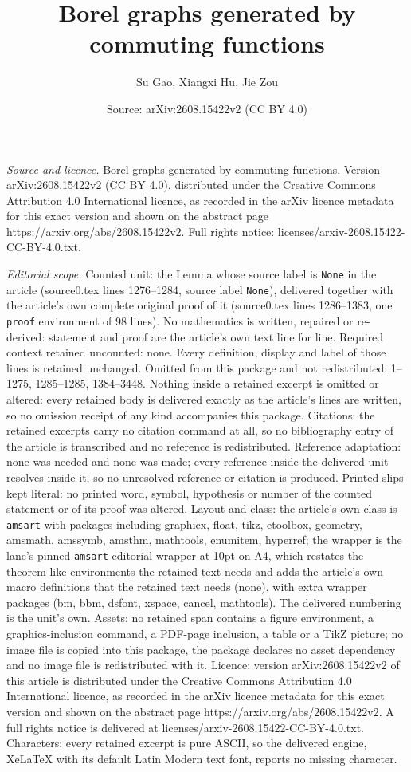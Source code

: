 \documentclass[10pt,a4paper]{amsart}
\title[Borel graphs generated by commuting functions]{Borel graphs generated by commuting functions}
\author{Su Gao, Xiangxi Hu, Jie Zou}
\date{Source: arXiv:2608.15422v2 (CC BY 4.0)}
\begin{document}
\maketitle

\noindent\emph{Source and licence.} Borel graphs generated by commuting functions. Version arXiv:2608.15422v2 (CC BY 4.0), distributed under the Creative Commons Attribution 4.0 International licence, as recorded in the arXiv licence metadata for this exact version and shown on the abstract page https://arxiv.org/abs/2608.15422v2. Full rights notice: licenses/arxiv-2608.15422-CC-BY-4.0.txt.\par\smallskip

\noindent\textit{Editorial scope.} Counted unit: the Lemma whose source label is \texttt{None} in the article (source0.tex lines 1276--1284, source label \texttt{None}), delivered together with the article's own complete original proof of it (source0.tex lines 1286--1383, one \texttt{proof} environment of 98 lines). No mathematics is written, repaired or re-derived: statement and proof are the article's own text line for line. Required context retained uncounted: none. Every definition, display and label of those lines is retained unchanged. Omitted from this package and not redistributed: 1--1275, 1285--1285, 1384--3448. Nothing inside a retained excerpt is omitted or altered: every retained body is delivered exactly as the article's lines are written, so no omission receipt of any kind accompanies this package. Citations: the retained excerpts carry no citation command at all, so no bibliography entry of the article is transcribed and no reference is redistributed. Reference adaptation: none was needed and none was made; every reference inside the delivered unit resolves inside it, so no unresolved reference or citation is produced. Printed slips kept literal: no printed word, symbol, hypothesis or number of the counted statement or of its proof was altered. Layout and class: the article's own class is \texttt{amsart} with packages including graphicx, float, tikz, etoolbox, geometry, amsmath, amssymb, amsthm, mathtools, enumitem, hyperref; the wrapper is the lane's pinned \texttt{amsart} editorial wrapper at 10pt on A4, which restates the theorem-like environments the retained text needs and adds the article's own macro definitions that the retained text needs (none), with extra wrapper packages (bm, bbm, dsfont, xspace, cancel, mathtools). The delivered numbering is the unit's own. Assets: no retained span contains a figure environment, a graphics-inclusion command, a PDF-page inclusion, a table or a TikZ picture; no image file is copied into this package, the package declares no asset dependency and no image file is redistributed with it. Licence: version arXiv:2608.15422v2 of this article is distributed under the Creative Commons Attribution 4.0 International licence, as recorded in the arXiv licence metadata for this exact version and shown on the abstract page https://arxiv.org/abs/2608.15422v2. A full rights notice is delivered at licenses/arxiv-2608.15422-CC-BY-4.0.txt. Characters: every retained excerpt is pure ASCII, so the delivered engine, XeLaTeX with its default Latin Modern text font, reports no missing character.
\end{document}
